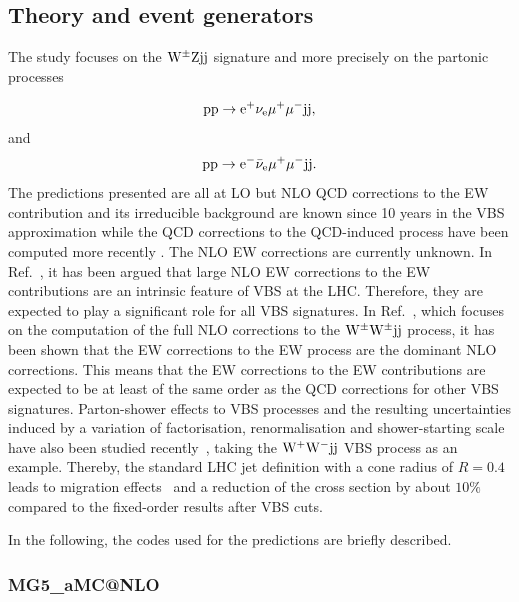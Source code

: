 \documentclass[11pt]{cernrep}
\makeatletter
\newcommand{\MGaMC}{M\protect\scalebox{0.8}{AD}G\protect\scalebox{0.8}{RAPH}5\_aMC@NLO\xspace}
\makeatother
\begin{document}
\subsection{Theory and event generators \label{vbs_theory}}

The study focuses on the ${\rm W}^{\pm}{\rm Z}{\rm j}{\rm j}$ signature and more precisely on the partonic processes

\begin{equation}
 {\rm p} {\rm p} \to {\rm e}^+  \nu_{\rm e}  \mu^+ \mu^- {\rm j} {\rm j} ,
\end{equation}
%
and
%
\begin{equation}
 {\rm p} {\rm p} \to {\rm e}^-  \bar \nu_{\rm e}  \mu^+ \mu^- {\rm j} {\rm j}.
\end{equation}
%
The predictions presented are all at LO but NLO QCD corrections to the EW contribution and its irreducible background are known since 10 years in the VBS approximation \cite{Bozzi:2007ur} while the QCD corrections to the QCD-induced process have been computed more recently \cite{Campanario:2013qba}.
The NLO EW corrections are currently unknown.
In Ref.~\cite{Biedermann:2016yds}, it has been argued that large NLO EW corrections to the EW contributions are an intrinsic feature of VBS at the LHC.
Therefore, they are expected to play a significant role for all VBS signatures.
In Ref.~\cite{Biedermann:2017bss}, which focuses on the computation of the full NLO corrections to the ${\rm W}^\pm{\rm W}^\pm{\rm j}{\rm j}$ process, it has been shown that the EW corrections to the EW process are the dominant NLO corrections.
This means that the EW corrections to the EW contributions are expected to be at least of the same order as the QCD corrections for other VBS signatures.
Parton-shower effects to VBS processes and the resulting uncertainties
induced by a variation of factorisation, renormalisation and
shower-starting scale have also been studied
recently~\cite{Rauch:2016upa,Rauch:2016pai}, taking the ${\rm W}^+{\rm
W}^-{\rm j}{\rm j}$ VBS process as an example. Thereby, the standard LHC
jet definition with a cone radius of $R{=}0.4$ leads to migration
effects~\cite{Rauch:2017cfu} and a reduction of the cross section by about $10\%$ compared to
the fixed-order results after VBS cuts.

In the following, the codes used for the predictions are briefly described.

\subsubsection*{\protect\MGaMC \label{vbs_mgamc}}
\end{document}
